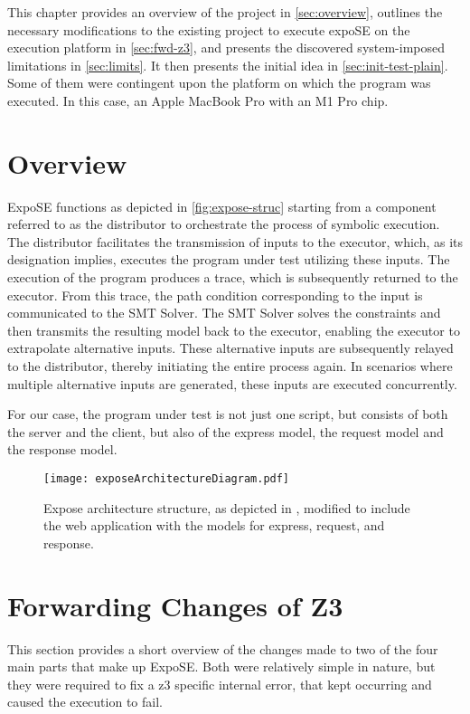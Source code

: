 
This chapter provides an overview of the project in \autoref{sec:overview}, outlines the necessary modifications to the existing project to execute expoSE on the execution platform in \autoref{sec:fwd-z3}, and presents the discovered system-imposed limitations in \autoref{sec:limits}. It then presents the initial idea in \autoref{sec:init-test-plain}. Some of them were contingent upon the platform on which the program was executed. In this case, an Apple MacBook Pro with an M1 Pro chip. 

\section{Overview}
\label{sec:overview}


ExpoSE functions as depicted in \autoref{fig:expose-struc} starting from a component referred to as the distributor to orchestrate the process of symbolic execution. The distributor facilitates the transmission of inputs to the executor, which, as its designation implies, executes the program under test utilizing these inputs. The execution of the program produces a trace, which is subsequently returned to the executor. From this trace, the path condition corresponding to the input is communicated to the SMT Solver. The SMT Solver solves the constraints and then transmits the resulting model back to the executor, enabling the executor to extrapolate alternative inputs. These alternative inputs are subsequently relayed to the distributor, thereby initiating the entire process again. In scenarios where multiple alternative inputs are generated, these inputs are executed concurrently.

For our case, the program under test is not just one script, but consists of both the server and the client, but also of the express model, the request model and the response model. 



\begin{figure}
  \centering
\texttt{[image: exposeArchitectureDiagram.pdf]}
 \caption[Expose Architecture]{Expose architecture structure, as depicted in \cite{loring_practical_2021}, modified to include the web application with the models for express, request, and response.}
     \label{fig:expose-struc}
\end{figure}


\FloatBarrier
\section{Forwarding Changes of Z3}
\label{sec:fwd-z3}
This section provides a short overview of the changes made to two of the four main parts that make up ExpoSE. Both were relatively simple in nature, but they were required to fix a z3 specific internal error, that kept occurring and caused the execution to fail.

